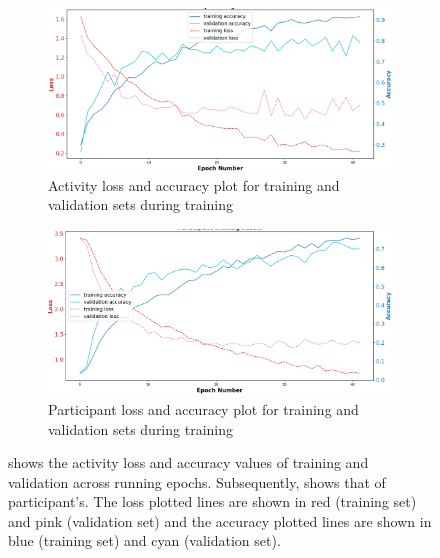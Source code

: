 \documentclass{l4proj}
\begin{document}
\begin{figure}[h]
    \centering
    \begin{subfigure}{0.47\textwidth}
        \includegraphics[width=\textwidth]{images/multitask-activity-final-test.png}
        \caption{Activity loss and accuracy plot for training and validation sets during training}
        \label{fig:multitask-activity-final-test}
    \end{subfigure}
    \qquad
    \begin{subfigure}{0.47\textwidth}
        \includegraphics[width=\textwidth]{images/multitask-participant-final-test.png}
        \caption{Participant loss and accuracy plot for training and validation sets during training}
        \label{fig:multitask-participant-final-test}
    \end{subfigure}
    \caption{ shows the activity loss and accuracy values of training and validation across running epochs. Subsequently,  shows that of participant’s. The loss plotted lines are shown in red (training set) and pink (validation set) and the accuracy plotted lines are shown in blue (training set) and cyan (validation set).}
    \label{fig:multitask-final-loss-and-accuracy-plots}
\end{figure}
\end{document}
